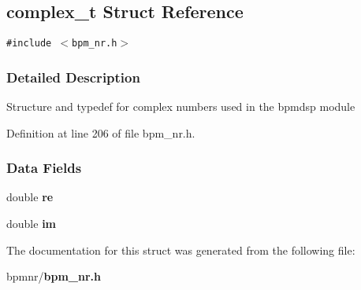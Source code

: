 \subsection{complex\_\-t Struct Reference}
\label{structcomplex__t}
{\tt \#include $<$bpm\_\-nr.h$>$}



\subsubsection{Detailed Description}
Structure and typedef for complex numbers used in the bpmdsp module 

Definition at line 206 of file bpm\_\-nr.h.\subsubsection*{Data Fields}
\begin{CompactItemize}
\item 
double \textbf{re}\label{structcomplex__t_ec1e67233fb6806c75b83af9bb83ff77}

\item 
double \textbf{im}\label{structcomplex__t_0a5273e242bd318097898ba9bb2bd625}

\end{CompactItemize}


The documentation for this struct was generated from the following file:\begin{CompactItemize}
\item 
bpmnr/{\bf bpm\_\-nr.h}\end{CompactItemize}
